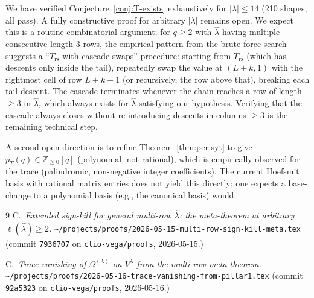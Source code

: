 \documentclass[11pt]{article}
\theoremstyle{definition}
\newcommand{\Vlam}{V^{\lambda}}
\newcommand{\Om}{\Omega}
\newcommand{\hatl}{\widehat\lambda}
\newcommand{\Trs}{T_{\mathrm{rs}}}
\begin{document}
We have verified Conjecture~\ref{conj:T-exists} exhaustively for
$|\lambda| \le 14$ (210 shapes, all pass).  A fully constructive proof
for arbitrary $|\lambda|$ remains open.  We expect this is a routine
combinatorial argument; for $q \ge 2$ with $\hatl$ having multiple
consecutive length-$3$ rows, the empirical pattern from the brute-force
search suggests a ``$\Trs$ with cascade swaps'' procedure: starting
from $\Trs$ (which has descents only inside the tail), repeatedly swap
the value at $(L+k, 1)$ with the rightmost cell of row $L+k-1$ (or
recursively, the row above that), breaking each tail descent.  The
cascade terminates whenever the chain reaches a row of length $\ge 3$
in $\hatl$, which always exists for $\hatl$ satisfying our hypothesis.
Verifying that the cascade always closes without re-introducing
descents in columns $\ge 3$ is the remaining technical step.

A second open direction is to refine Theorem~\ref{thm:per-syt} to give
$p_T(q) \in \mathbb{Z}_{\ge 0}[q]$ (polynomial, not rational), which is
empirically observed for the trace (palindromic, non-negative integer
coefficients).  The current Hoefsmit basis with rational matrix
entries does not yield this directly; one expects a base-change to a
polynomial basis (e.g., the canonical basis) would.

\begin{thebibliography}{9}
C.\ \emph{Extended sign-kill for general multi-row $\hatl$: the
meta-theorem at arbitrary $\ell(\hatl) \ge 2$.}
\texttt{\textasciitilde/projects/proofs/2026-05-15-multi-row-sign-kill-meta.tex}
(commit \texttt{7936707} on \texttt{clio-vega/proofs}, 2026-05-15.)

C.\ \emph{Trace vanishing of $\Om^{(\lambda)}$ on $\Vlam$ from the
multi-row meta-theorem.}
\texttt{\textasciitilde/projects/proofs/2026-05-16-trace-vanishing-from-pillar1.tex}
(commit \texttt{92a5323} on \texttt{clio-vega/proofs}, 2026-05-16.)
\end{thebibliography}
\end{document}
